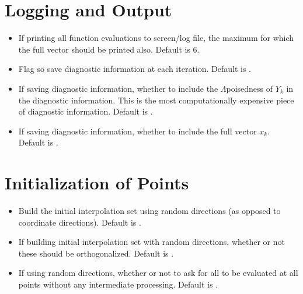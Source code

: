 \documentclass[letterpaper,10pt,english]{sphinxmanual}
\begin{document}
\section{Logging and Output}
\label{\detokenize{advanced:logging-and-output}}\begin{itemize}
\item {} 
 \sphinxhyphen{} If printing all function evaluations to screen/log file, the maximum  for which the full vector  should be printed also. Default is 6.

\item {} 
 \sphinxhyphen{} Flag so save diagnostic information at each iteration. Default is .

\item {} 
 \sphinxhyphen{} If saving diagnostic information, whether to include the \(\Lambda\)\sphinxhyphen{}poisedness of \(Y_k\) in the diagnostic information. This is the most computationally expensive piece of diagnostic information. Default is .

\item {} 
 \sphinxhyphen{} If saving diagnostic information, whether to include the full vector \(x_k\). Default is .

\end{itemize}


\section{Initialization of Points}
\label{\detokenize{advanced:initialization-of-points}}\begin{itemize}
\item {} 
 \sphinxhyphen{} Build the initial interpolation set using random directions (as opposed to coordinate directions). Default is .

\item {} 
 \sphinxhyphen{} If building initial interpolation set with random directions, whether or not these should be orthogonalized. Default is .

\item {} 
 \sphinxhyphen{} If using random directions, whether or not to ask for all  to be evaluated at all points without any intermediate processing. Default is .

\end{itemize}
\end{document}
